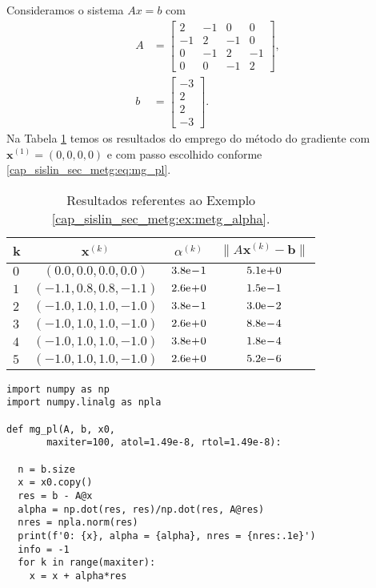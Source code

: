 \begin{ex}\label{ex:metg_alpha}
  Consideramos o sistema $Ax = b$ com
  \begin{align}
    A &=
    \begin{bmatrix}
      2 & -1 & 0 & 0\\
      -1 & 2 & -1 & 0\\
      0 & -1 & 2 & -1 \\
      0 & 0 & -1 & 2
    \end{bmatrix},\\
    b &=
    \begin{bmatrix}
      -3\\
      2\\
      2\\
      -3
    \end{bmatrix}.
  \end{align}
  Na Tabela \ref{cap_sislin_sec_metg:tab:metg_alpha} temos os resultados do emprego do método do gradiente com $\pmb{x}^{(1)} = (0, 0, 0, 0)$ e com passo escolhido conforme \eqref{cap_sislin_sec_metg:eq:mg_pl}.

  \begin{table}[H]
    \centering
    \caption{Resultados referentes ao Exemplo \ref{cap_sislin_sec_metg:ex:metg_alpha}.}
    \label{cap_sislin_sec_metg:tab:metg_alpha}
    \begin{tabular}{l|c|cc}
      k & $\pmb{x}^{(k)}$ & $\alpha^{(k)}$ & $\|A\pmb{x}^{(k)}-\pmb{b}\|$\\\hline
      $0$ & $(0.0, 0.0, 0.0, 0.0)$ & $3.8\mathrm{e}\!-\!1$ & $5.1\mathrm{e}\!+\!0$ \\
      $1$ & $(-1.1, 0.8, 0.8, -1.1)$ & $2.6\mathrm{e}\!+\!0$ & $1.5\mathrm{e}\!-\!1$ \\
      $2$ & $(-1.0, 1.0, 1.0, -1.0)$ & $3.8\mathrm{e}\!-\!1$ & $3.0\mathrm{e}\!-\!2$ \\
      $3$ & $(-1.0, 1.0, 1.0, -1.0)$ & $2.6\mathrm{e}\!+\!0$ & $8.8\mathrm{e}\!-\!4$ \\
      $4$ & $(-1.0, 1.0, 1.0, -1.0)$ & $3.8\mathrm{e}\!+\!0$ & $1.8\mathrm{e}\!-\!4$ \\
      $5$ & $(-1.0, 1.0, 1.0, -1.0)$ & $2.6\mathrm{e}\!+\!0$ & $5.2\mathrm{e}\!-\!6$ \\\hline
    \end{tabular}
  \end{table}

\begin{lstlisting}
import numpy as np
import numpy.linalg as npla

def mg_pl(A, b, x0,
       maxiter=100, atol=1.49e-8, rtol=1.49e-8):
    
  n = b.size
  x = x0.copy()
  res = b - A@x
  alpha = np.dot(res, res)/np.dot(res, A@res)
  nres = npla.norm(res)
  print(f'0: {x}, alpha = {alpha}, nres = {nres:.1e}')
  info = -1
  for k in range(maxiter):
    x = x + alpha*res
    

\end{lstlisting}
\end{ex}
